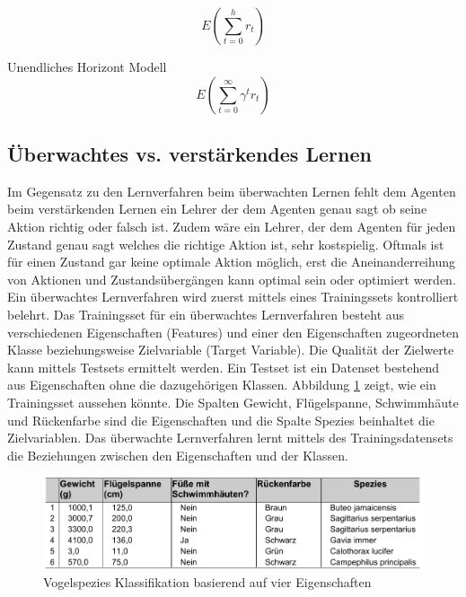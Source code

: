 \begin{equation}
E(\sum_{t=0}^{h} r_t)
\end{equation}


Unendliches Horizont Modell
\begin{equation}
E(\sum_{t=0}^{\infty} \gamma^t r_t)
\end{equation}

\subsection{Überwachtes \acs{vs.} verstärkendes Lernen}
Im Gegensatz zu den Lernverfahren beim überwachten Lernen fehlt dem Agenten beim verstärkenden Lernen ein Lehrer der dem Agenten genau sagt ob seine Aktion richtig oder falsch ist. Zudem wäre ein Lehrer, der dem Agenten für jeden Zustand genau sagt welches die richtige Aktion ist, sehr kostspielig. Oftmals ist für einen Zustand gar keine optimale Aktion möglich, erst die Aneinanderreihung von Aktionen und Zustandsübergängen kann optimal sein oder optimiert werden\cite[\acs{vgl.} 397]{Alpaydin}. \\

Ein überwachtes Lernverfahren wird zuerst mittels eines Trainingssets kontrolliert belehrt. Das Trainingsset für ein überwachtes Lernverfahren besteht aus verschiedenen Eigenschaften (Features) und einer den Eigenschaften zugeordneten Klasse beziehungsweise Zielvariable (Target Variable). Die Qualität der Zielwerte kann mittels Testsets ermittelt werden. Ein Testset ist ein Datenset bestehend aus Eigenschaften ohne die dazugehörigen Klassen. Abbildung \ref{fig:vogel_spezies} zeigt, wie ein Trainingsset aussehen könnte\cite[8]{Harrington}. Die Spalten Gewicht, Flügelspanne, Schwimmhäute und Rückenfarbe sind die Eigenschaften und die Spalte Spezies beinhaltet die Zielvariablen. Das überwachte Lernverfahren lernt mittels des Trainingsdatensets die Beziehungen zwischen den Eigenschaften und der Klassen. \\

\begin{figure}[!htbp]
  \centering
  \includegraphics[scale = 0.89]{inhalt/abbildungen/vogel_spezies.pdf}
  \caption{Vogelspezies Klassifikation basierend auf vier Eigenschaften}
  \label{fig:vogel_spezies}
\end{figure} 

